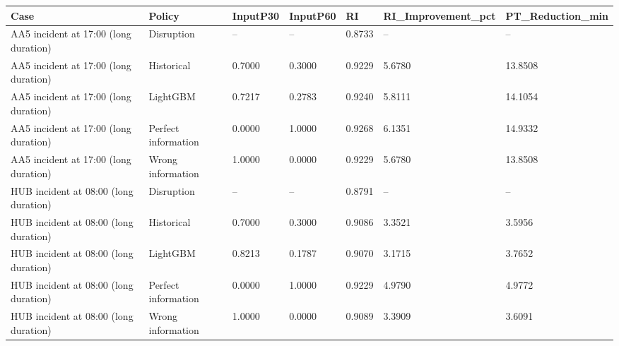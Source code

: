 \begin{tabular}{lllllll}
\toprule
Case & Policy & InputP30 & InputP60 & RI & RI\_Improvement\_pct & PT\_Reduction\_min \\
\midrule
AA5 incident at 17:00 (long duration) & Disruption & -- & -- & 0.8733 & -- & -- \\
AA5 incident at 17:00 (long duration) & Historical & 0.7000 & 0.3000 & 0.9229 & 5.6780 & 13.8508 \\
AA5 incident at 17:00 (long duration) & LightGBM & 0.7217 & 0.2783 & 0.9240 & 5.8111 & 14.1054 \\
AA5 incident at 17:00 (long duration) & Perfect information & 0.0000 & 1.0000 & 0.9268 & 6.1351 & 14.9332 \\
AA5 incident at 17:00 (long duration) & Wrong information & 1.0000 & 0.0000 & 0.9229 & 5.6780 & 13.8508 \\
HUB incident at 08:00 (long duration) & Disruption & -- & -- & 0.8791 & -- & -- \\
HUB incident at 08:00 (long duration) & Historical & 0.7000 & 0.3000 & 0.9086 & 3.3521 & 3.5956 \\
HUB incident at 08:00 (long duration) & LightGBM & 0.8213 & 0.1787 & 0.9070 & 3.1715 & 3.7652 \\
HUB incident at 08:00 (long duration) & Perfect information & 0.0000 & 1.0000 & 0.9229 & 4.9790 & 4.9772 \\
HUB incident at 08:00 (long duration) & Wrong information & 1.0000 & 0.0000 & 0.9089 & 3.3909 & 3.6091 \\
\bottomrule
\end{tabular}
